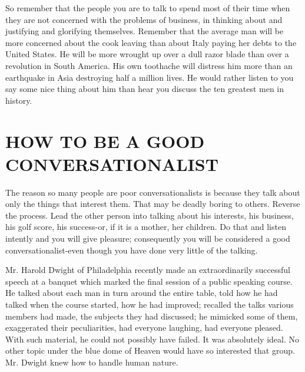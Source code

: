 \documentclass[10pt]{article}
\begin{document}
So remember that the people you are to talk to spend most of their time when they are not concerned with the problems of business, in thinking about and justifying and glorifying themselves. Remember that the average man will be more concerned about the cook leaving than about Italy paying her debts to the United States. He will be more wrought up over a dull razor blade than over a revolution in South America. His own toothache will distress him more than an earthquake in Asia destroying half a million lives. He would rather listen to you say some nice thing about him than hear you discuss the ten greatest men in history.

\section*{HOW TO BE A GOOD CONVERSATIONALIST}
The reason so many people are poor conversationalists is because they talk about only the things that interest them. That may be deadly boring to others. Reverse the process. Lead the other person into talking about his interests, his business, his golf score, his success-or, if it is a mother, her children. Do that and listen intently and you will give pleasure; consequently you will be considered a good conversationalist-even though you have done very little of the talking.

Mr. Harold Dwight of Philadelphia recently made an extraordinarily successful speech at a banquet which marked the final session of a public speaking course. He talked about each man in turn around the entire table, told how he had talked when the course started, how he had improved; recalled the talks various members had made, the subjects they had discussed; he mimicked some of them, exaggerated their peculiarities, had everyone laughing, had everyone pleased. With such material, he could not possibly have failed. It was absolutely ideal. No other topic under the blue dome of Heaven would have so interested that group. Mr. Dwight knew how to handle human nature.
\end{document}
